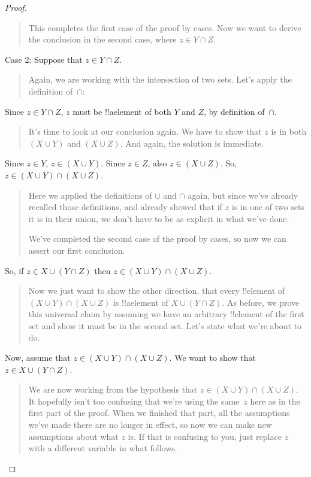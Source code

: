 \documentclass[../../../include/open-logic-section]{subfiles}
\begin{document}
\begin{proof}
\begin{quote}
This completes the first case of the proof by cases. Now we want to
derive the conclusion in the second case, where $z \in Y \cap Z$.
\end{quote}
Case 2: Suppose that $z \in Y \cap Z$.
\begin{quote}
Again, we are working with the intersection of two sets. Let's apply
the definition of~$\cap$:
\end{quote}
Since $z \in Y \cap Z$, $z$ must be !!a{element} of both $Y$ and $Z$, by
definition of~$\cap$.
\begin{quote}
It's time to look at our conclusion again. We have to show that $z$ is
in both $(X \cup Y)$ and $(X \cup Z)$. And again, the solution is
immediate.
\end{quote}
Since $z \in Y$, $z \in (X \cup Y)$. Since $z \in Z$, also $z \in (X
\cup Z)$.  So, $z \in (X \cup Y) \cap (X \cup Z)$.
\begin{quote}
Here we applied the definitions of $\cup$ and $\cap$ again, but since
we've already recalled those definitions, and already showed that if
$z$ is in one of two sets it is in their union, we don't have to be as
explicit in what we've done.

We've completed the second case of the proof by cases, so now we can
assert our first conclusion.
\end{quote}
So, if $z \in X \cup (Y \cap Z)$ then $z \in (X \cup Y) \cap (X \cup Z)$.
\begin{quote}
Now we just want to show the other direction, that every !!{element}
of $(X \cup Y) \cap (X \cup Z)$ is !!a{element} of $X \cup (Y \cap
Z)$. As before, we prove this universal claim by assuming we have an
arbitrary !!{element} of the first set and show it must be in the
second set. Let's state what we're about to do.
\end{quote}
Now, assume that $z \in (X \cup Y) \cap (X \cup Z)$. We want to show
that $z \in X \cup (Y \cap Z)$.
\begin{quote}
We are now working from the hypothesis that $z \in (X \cup Y) \cap (X
\cup Z)$. It hopefully isn't too confusing that we're using the
same~$z$ here as in the first part of the proof.  When we finished
that part, all the assumptions we've made there are no longer in
effect, so now we can make new assumptions about what $z$ is.  If that
is confusing to you, just replace $z$ with a different variable in
what follows.


\end{quote}
\end{proof}
\end{document}
